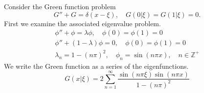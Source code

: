 \begin{Example}
  Consider the Green function problem
  \[
  G'' + G = \delta(x - \xi), \quad G(0|\xi) = G(1|\xi) = 0.
  \]
  First we examine the associated eigenvalue problem.
  \begin{gather*}
    \phi'' + \phi = \lambda \phi, \quad \phi(0) = \phi(1) = 0
    \\
    \phi'' + (1 - \lambda)\phi = 0, \quad \phi(0) = \phi(1) = 0
    \\
    \lambda_n = 1 - (n \pi)^2, \quad \phi_n = \sin(n \pi x), \quad n \in \mathbb{Z}^+
  \end{gather*}
  We write the Green function as a series of the eigenfunctions.
  \[
  G(x|\xi) = 2 \sum_{n = 1}^\infty \frac{ \sin(n \pi \xi) \sin(n \pi x) }{ 1 - (n \pi)^2 }
  \]
\end{Example}















